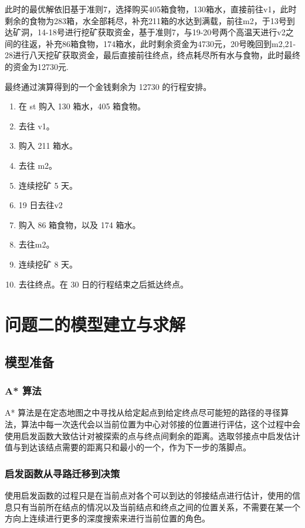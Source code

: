 \documentclass[a4paper]{ctexart}
\begin{document}
此时的最优解依旧基于准则7，选择购买405箱食物，130箱水，直接前往v1，此时剩余的食物为283箱，水全部耗尽，补充211箱的水达到满载，前往m2，于13号到达矿洞，14-18号进行挖矿获取资金，基于准则7，与19-20号两个高温天进行v2之间的往返，补充86箱食物，174箱水，此时剩余资金为4730元，20号晚回到m2,21-28进行八天挖矿获取资金，最后直接前往终点，终点耗尽所有水与食物，此时最终的资金为12730元.

最终通过演算得到的一个金钱剩余为 12730 的行程安排。

\begin{enumerate}
    \item 在 st 购入 130 箱水，405 箱食物。
    \item 去往 v1。
    \item 购入 211 箱水。
    \item 去往 m2。
    \item 连续挖矿 5 天。
    \item 19 日去往v2
    \item 购入 86 箱食物，以及 174 箱水。
    \item 去往m2。
    \item 连续挖矿 8 天。
    \item 去往终点。在 30 日的行程结束之后抵达终点。
\end{enumerate}

\section{问题二的模型建立与求解}

\subsection{模型准备}

\subsubsection{A* 算法}

A* 算法是在定态地图之中寻找从给定起点到给定终点尽可能短的路径的寻径算法，算法中每一次迭代会以当前位置为中心对邻接的位置进行评估，这个过程中会使用启发函数大致估计对被探索的点与终点间剩余的距离。选取邻接点中启发估计值与到达该结点需要的距离只和最小的一个，作为下一步的落脚点。

\subsubsection{启发函数从寻路迁移到决策}

使用启发函数的过程只是在当前点对各个可以到达的邻接结点进行估计，使用的信息只有当前所在结点的情况以及当前结点和终点之间的位置关系，不需要在某一个方向上连续进行更多的深度搜索来进行当前位置的角色。
\end{document}
